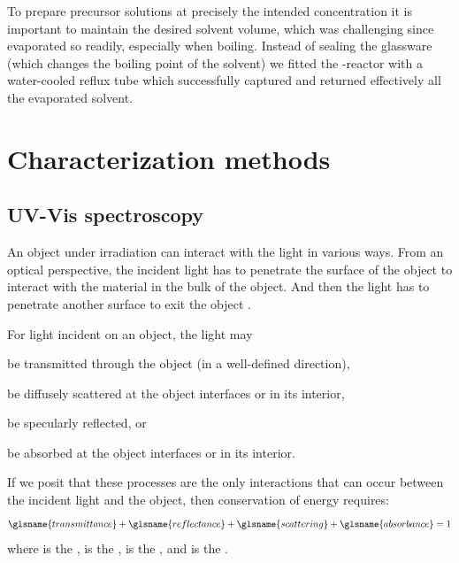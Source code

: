 \documentclass[draft,webedition,openright,titles,swedish,english]{LuaUUThesis}\usepackage[]{graphicx}\usepackage[]{xcolor}
\begin{document}
To prepare precursor solutions at precisely the intended concentration it is important to
maintain the desired solvent volume, which was challenging since  evaporated
so readily, especially when boiling.
Instead of sealing the glassware (which changes the boiling point of the solvent)
we fitted the -reactor with a water-cooled reflux tube which successfully captured
and returned effectively all the evaporated solvent.





\chapter{Characterization methods}%
\label{ch:characterization-methods}


\section{UV-Vis spectroscopy}
\label{methods:uvvis-spectroscopy}

An object under irradiation can interact with the light in various ways.
From an optical perspective, the incident light has to penetrate the surface of
the object to interact with the material in the bulk of the object. And then the
light has to penetrate another surface to exit the object \cite[p.\,71]{Stenzel2005}.

For light incident on an object, the light may
\begin{enumerate*}[label=(\alph*)]
\item be transmitted through the object (in a well-defined direction),
\item be diffusely scattered at the object interfaces or in its interior,
\item be specularly reflected, or
\item be absorbed at the object interfaces or in its interior.
\end{enumerate*}
If we posit that these processes are the only interactions that can occur
between the incident light and the object, then conservation of energy requires:
\begin{equation}\label{eq:TRSA=1}
\glsname{transmittance} + \glsname{reflectance} + \glsname{scattering} + \glsname{absorbance} = 1
\end{equation}
where  is the ,
 is the ,
 is the , and
 is the .
\end{document}
